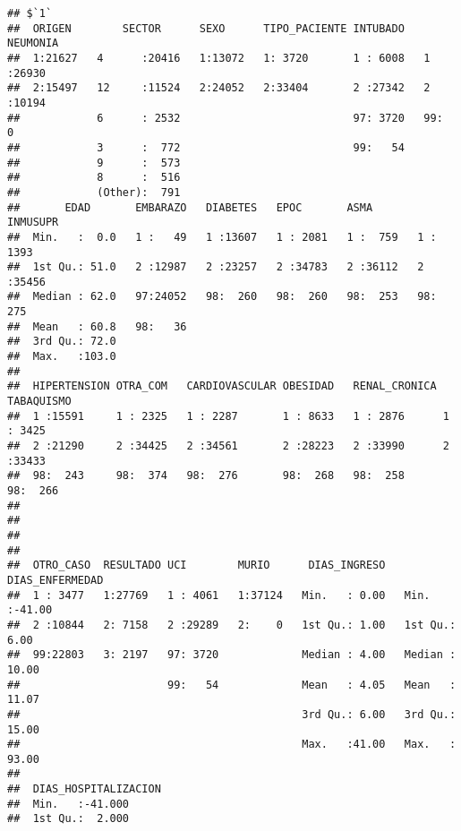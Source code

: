 \documentclass[]{article}
\begin{document}
\begin{verbatim}
## $`1`
##  ORIGEN        SECTOR      SEXO      TIPO_PACIENTE INTUBADO   NEUMONIA  
##  1:21627   4      :20416   1:13072   1: 3720       1 : 6008   1 :26930  
##  2:15497   12     :11524   2:24052   2:33404       2 :27342   2 :10194  
##            6      : 2532                           97: 3720   99:    0  
##            3      :  772                           99:   54             
##            9      :  573                                                
##            8      :  516                                                
##            (Other):  791                                                
##       EDAD       EMBARAZO   DIABETES   EPOC       ASMA       INMUSUPR  
##  Min.   :  0.0   1 :   49   1 :13607   1 : 2081   1 :  759   1 : 1393  
##  1st Qu.: 51.0   2 :12987   2 :23257   2 :34783   2 :36112   2 :35456  
##  Median : 62.0   97:24052   98:  260   98:  260   98:  253   98:  275  
##  Mean   : 60.8   98:   36                                              
##  3rd Qu.: 72.0                                                         
##  Max.   :103.0                                                         
##                                                                        
##  HIPERTENSION OTRA_COM   CARDIOVASCULAR OBESIDAD   RENAL_CRONICA TABAQUISMO
##  1 :15591     1 : 2325   1 : 2287       1 : 8633   1 : 2876      1 : 3425  
##  2 :21290     2 :34425   2 :34561       2 :28223   2 :33990      2 :33433  
##  98:  243     98:  374   98:  276       98:  268   98:  258      98:  266  
##                                                                            
##                                                                            
##                                                                            
##                                                                            
##  OTRO_CASO  RESULTADO UCI        MURIO      DIAS_INGRESO   DIAS_ENFERMEDAD 
##  1 : 3477   1:27769   1 : 4061   1:37124   Min.   : 0.00   Min.   :-41.00  
##  2 :10844   2: 7158   2 :29289   2:    0   1st Qu.: 1.00   1st Qu.:  6.00  
##  99:22803   3: 2197   97: 3720             Median : 4.00   Median : 10.00  
##                       99:   54             Mean   : 4.05   Mean   : 11.07  
##                                            3rd Qu.: 6.00   3rd Qu.: 15.00  
##                                            Max.   :41.00   Max.   : 93.00  
##                                                                            
##  DIAS_HOSPITALIZACION
##  Min.   :-41.000     
##  1st Qu.:  2.000     

\end{verbatim}
\end{document}
